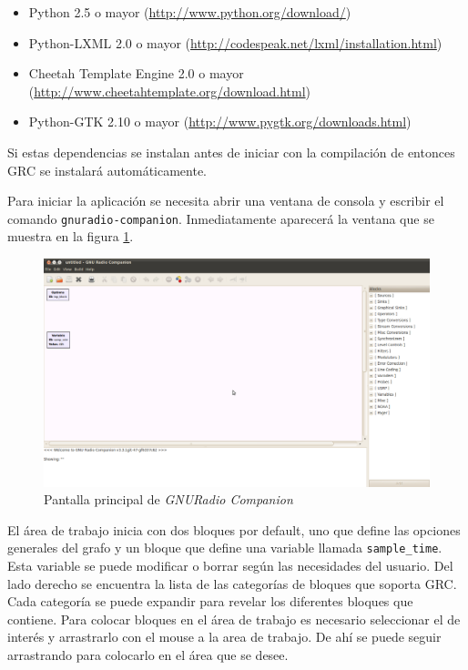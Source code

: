 \begin{itemize}
  \item Python 2.5 o mayor (\url{http://www.python.org/download/})
  \item Python-LXML 2.0 o  mayor (\url{http://codespeak.net/lxml/installation.html})
  \item Cheetah Template Engine 2.0 o mayor (\url{http://www.cheetahtemplate.org/download.html})
  \item Python-GTK 2.10 o mayor (\url{http://www.pygtk.org/downloads.html})
\end{itemize}

Si estas dependencias se instalan antes de iniciar con la compilaci\'on de \gnuradio entonces GRC se
instalar\'a autom\'aticamente.

Para iniciar la aplicaci\'on se necesita abrir una ventana de consola y escribir el comando
\verb|gnuradio-companion|. Inmediatamente aparecer\'a la ventana que se muestra en la figura
\ref{fig:grc}.

\begin{figure}[tp]
  \centering
  \includegraphics[width=5.5in]{figs/grc1}
  \vspace{0.1in}
  \caption{Pantalla principal de \emph{GNURadio Companion}}
  \label{fig:grc}
\end{figure}

El \'area de trabajo inicia con dos bloques por default, uno que define las opciones generales del
grafo y un bloque que define una variable llamada \verb|sample_time|. Esta variable se puede
modificar o borrar seg\'un las necesidades del usuario. Del lado derecho se encuentra la lista de las
categor\'ias de bloques que soporta GRC. Cada categor\'ia se puede expandir para revelar los
diferentes bloques que contiene. Para colocar bloques en el \'area de trabajo es necesario
seleccionar el de inter\'es y arrastrarlo con el mouse a la area de trabajo. De ah\'i se puede seguir
arrastrando para colocarlo en el \'area que se desee. 

